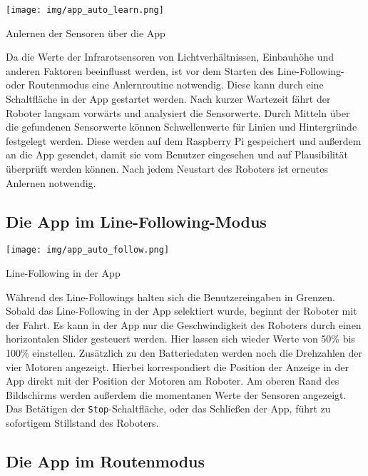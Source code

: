 \documentclass[12pt, a4paper]{report}
\begin{document}
\begin{minipage}{\linewidth}
   \centering
   \captionsetup{type=figure, justification=centering}
   \texttt{[image: img/app\_auto\_learn.png]}
   \caption{Anlernen der Sensoren über die App}
\end{minipage}
\vspace*{0.25cm}

Da die Werte der Infrarotsensoren von Lichtverhältnissen, Einbauhöhe und anderen Faktoren beeinflusst werden, ist vor dem Starten des Line-Following- oder Routenmodus eine Anlernroutine notwendig. Diese kann durch eine Schaltfläche in der App gestartet werden. Nach kurzer Wartezeit fährt der Roboter langsam vorwärts und analysiert die Sensorwerte. Durch Mitteln über die gefundenen Sensorwerte können Schwellenwerte für Linien und Hintergründe festgelegt werden. Diese werden auf dem Raspberry Pi gespeichert und außerdem an die App gesendet, damit sie vom Benutzer eingesehen und auf Plausibilität überprüft werden können. Nach jedem Neustart des Roboters ist erneutes Anlernen notwendig.


\subsection{Die App im Line-Following-Modus}

\begin{minipage}{\linewidth}
   \centering
   \captionsetup{type=figure, justification=centering}
   \texttt{[image: img/app\_auto\_follow.png]}
   \caption{Line-Following in der App}
\end{minipage}
\vspace*{0.25cm}

Während des Line-Followings halten sich die Benutzereingaben in Grenzen. Sobald das Line-Following in der App selektiert wurde, beginnt der Roboter mit der Fahrt. Es kann in der App nur die Geschwindigkeit des Roboters durch einen horizontalen Slider gesteuert werden. Hier lassen sich wieder Werte von 50\% bis 100\% einstellen. Zusätzlich zu den Batteriedaten werden noch die Drehzahlen der vier Motoren angezeigt. Hierbei korrespondiert die Position der Anzeige in der App direkt mit der Position der Motoren am Roboter. Am oberen Rand des Bildschirms werden außerdem die momentanen Werte der Sensoren angezeigt. Das Betätigen der \texttt{Stop}-Schaltfläche, oder das Schließen der App, führt zu sofortigem Stillstand des Roboters.


\newpage
\subsection{Die App im Routenmodus}
\end{document}
